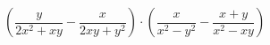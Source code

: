 \begin{ex}[type=expression]
	\begin{condition}
		 \( \left( \dfrac{y}{2x^2+xy}-\dfrac{x}{2xy+y^2} \right) \cdot\left( \dfrac{x}{x^2-y^2}-\dfrac{x+y}{x^2-xy} \right)\)
	\end{condition}
\end{ex}